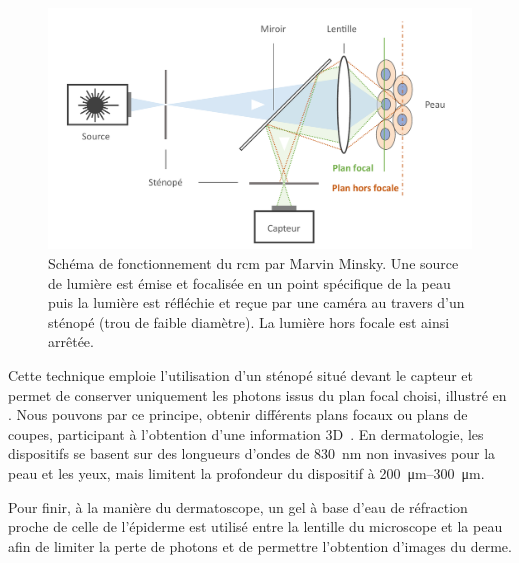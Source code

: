 \addtocounter{footnote}{1}

\begin{figure}[H]
\centering
    \includegraphics[width=0.9\linewidth]{contents/chapter_2/resources/scheme_principle_rcm.pdf}
    \caption{Schéma de fonctionnement du \gls{rcm} par Marvin Minsky. Une source de lumière est émise et focalisée en un point spécifique de la peau puis la lumière est réfléchie et reçue par une caméra au travers d'un sténopé (trou de faible diamètre). La lumière hors focale est ainsi arrêtée.}
    \label{fig:scheme_principle_rcm}
\end{figure}\par

Cette technique emploie l’utilisation d’un sténopé situé devant le capteur et permet de conserver uniquement les photons issus du plan focal choisi, illustré en . Nous pouvons par ce principe, obtenir différents plans focaux ou plans de coupes, participant à l’obtention d’une information 3D~\cite{Sheppard2019}. En dermatologie, les dispositifs se basent sur des longueurs d’ondes de \SI{830}{\nano\metre} non invasives pour la peau et les yeux, mais limitent la profondeur du dispositif à \SIrange{200}{300}{\micro\metre}.\par

Pour finir, à la manière du dermatoscope, un gel à base d’eau de réfraction proche de celle de l’épiderme est utilisé entre la lentille du microscope et la peau afin de limiter la perte de photons et de permettre l’obtention d’images du derme.\par

